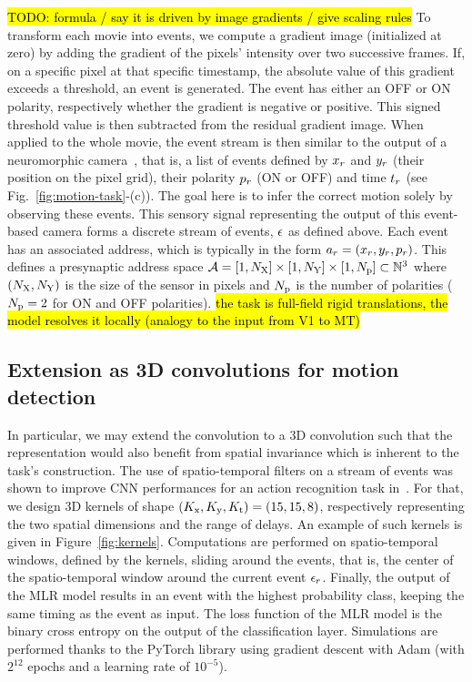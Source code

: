 \documentclass[default]{sn-jnl}%
\theoremstyle{thmstyleone}%
\theoremstyle{thmstyletwo}%
\theoremstyle{thmstylethree}%
\newcommand{\seeFig}[1]{see Fig.~\ref{fig:#1}}%
\DeclareRobustCommand{\note}[1]{{\sethlcolor{yellow}\hl{#1}}}
\begin{document}
\note{ TODO: formula / say it is driven by image gradients / give scaling rules }
To transform each movie into events, we compute a gradient image (initialized at zero) by adding the gradient of the pixels' intensity over two successive frames. If, on a specific pixel at that specific timestamp, the absolute value of this gradient exceeds a threshold, an event is generated. The event has either an OFF or ON polarity, respectively whether the gradient is negative or positive. This signed threshold value is then subtracted from the residual gradient image. When applied to the whole movie, the event stream is then similar to the output of a neuromorphic camera~\citep{rasetto_challenges_2022}, that is, a list of events defined by $x_r$ and $y_r$ (their position on the pixel grid), their polarity $p_r$ (ON or OFF) and time $t_r$  (\seeFig{motion-task}-(c)). The goal here is to infer the correct motion solely by observing these events. 
This sensory signal representing the output of this event-based camera forms a discrete stream of events, $\epsilon$ as defined above.   
Each event has an associated address, which is typically in the form $a_r=(x_r, y_r, p_r)$. This defines a presynaptic address space $\mathcal{A} = [1, N_\text{X}]\times[1, N_\text{Y}] \times [1, N_\text{p}] \subset \mathbb{N}^3$ where $(N_\text{X}, N_\text{Y})$ is the size of the sensor in pixels and $N_\text{p}$ is the number of polarities  ($N_\text{p}=2$ for ON and OFF polarities). 
\note{ the task is full-field rigid translations, the model resolves it locally (analogy to the input from V1 to MT) }

\subsection{Extension as 3D convolutions for motion detection}
%
In particular, we may extend the convolution to a 3D convolution such that the representation would also benefit from spatial invariance which is inherent to the task's construction. The use of spatio-temporal filters on a stream of events was shown to improve CNN performances for an action recognition task in~\citep{ghosh_spatiotemporal_2019}.
For that, we design 3D kernels of shape  $(K_\text{x}, K_\text{y}, K_\text{t}) = (15, 15, 8)$, respectively representing the two spatial dimensions and the range of delays. An example of such kernels is given in Figure~\ref{fig:kernels}.
Computations are performed on spatio-temporal windows, defined by the kernels, sliding around the events, that is, the center of the spatio-temporal window around the current event $\epsilon_r$.
%
Finally, the output of the MLR model results in an event with the highest probability class, keeping the same timing as the event as input.
%
The loss function of the MLR model is the binary cross entropy on the output of the classification layer. Simulations are performed thanks to the PyTorch library using gradient descent with Adam (with $2^{12}$ epochs and a learning rate of $10^{-5}$). 
%
\end{document}
